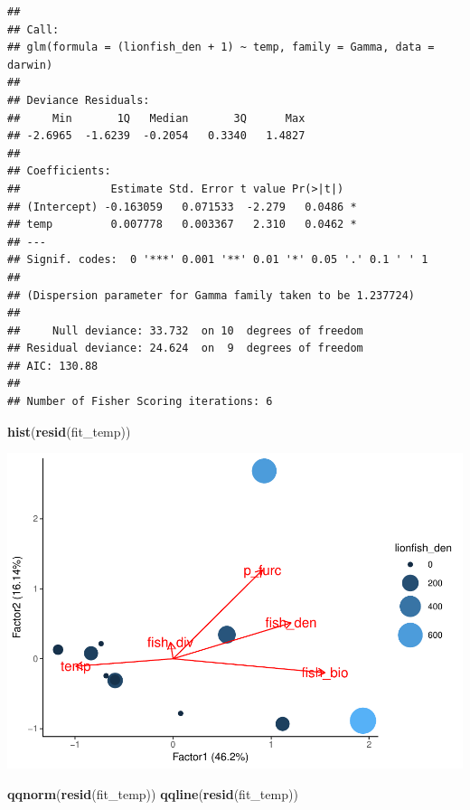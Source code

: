 \documentclass[]{article}
\newenvironment{Shaded}{\begin{snugshade}}{\end{snugshade}}
\newcommand{\KeywordTok}[1]{\textcolor[rgb]{0.13,0.29,0.53}{\textbf{#1}}}
\newcommand{\NormalTok}[1]{#1}
\begin{document}
\begin{verbatim}
## 
## Call:
## glm(formula = (lionfish_den + 1) ~ temp, family = Gamma, data = darwin)
## 
## Deviance Residuals: 
##     Min       1Q   Median       3Q      Max  
## -2.6965  -1.6239  -0.2054   0.3340   1.4827  
## 
## Coefficients:
##              Estimate Std. Error t value Pr(>|t|)  
## (Intercept) -0.163059   0.071533  -2.279   0.0486 *
## temp         0.007778   0.003367   2.310   0.0462 *
## ---
## Signif. codes:  0 '***' 0.001 '**' 0.01 '*' 0.05 '.' 0.1 ' ' 1
## 
## (Dispersion parameter for Gamma family taken to be 1.237724)
## 
##     Null deviance: 33.732  on 10  degrees of freedom
## Residual deviance: 24.624  on  9  degrees of freedom
## AIC: 130.88
## 
## Number of Fisher Scoring iterations: 6
\end{verbatim}

\begin{Shaded}
\begin{Highlighting}[]
\KeywordTok{hist}\NormalTok{(}\KeywordTok{resid}\NormalTok{(fit_temp))}
\end{Highlighting}
\end{Shaded}

\includegraphics{darwin_GLM_final_files/figure-latex/unnamed-chunk-9-1.pdf}

\begin{Shaded}
\begin{Highlighting}[]
\KeywordTok{qqnorm}\NormalTok{(}\KeywordTok{resid}\NormalTok{(fit_temp))}
\KeywordTok{qqline}\NormalTok{(}\KeywordTok{resid}\NormalTok{(fit_temp))}
\end{Highlighting}
\end{Shaded}
\end{document}
